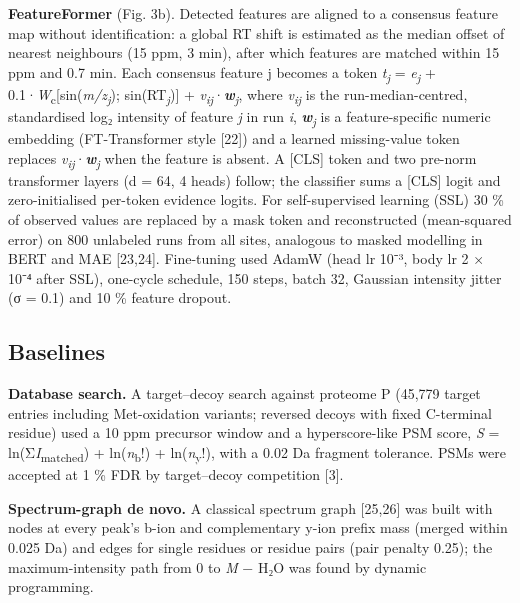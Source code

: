 \documentclass[
]{article}
\begin{document}
\textbf{FeatureFormer} (Fig. 3b). Detected features are aligned to a
consensus feature map without identification: a global RT shift is
estimated as the median offset of nearest neighbours (15 ppm, 3 min),
after which features are matched within 15 ppm and 0.7 min. Each
consensus feature j becomes a token \emph{t}\textsubscript{\emph{j}} =
\emph{e}\textsubscript{\emph{j}} +
0.1·\emph{W}\textsubscript{c}{[}sin(\emph{m/z}\textsubscript{\emph{j}});
sin(RT\textsubscript{\emph{j}}){]} +
\emph{v}\textsubscript{\emph{ij}}·\textbf{\emph{w}}\textsubscript{\emph{j}},
where \emph{v}\textsubscript{\emph{ij}} is the run-median-centred,
standardised log₂ intensity of feature \emph{j} in run \emph{i},
\textbf{\emph{w}}\textsubscript{\emph{j}} is a feature-specific numeric
embedding (FT-Transformer style {[}22{]}) and a learned missing-value
token replaces
\emph{v}\textsubscript{\emph{ij}}·\textbf{\emph{w}}\textsubscript{\emph{j}}
when the feature is absent. A {[}CLS{]} token and two pre-norm
transformer layers (d = 64, 4 heads) follow; the classifier sums a
{[}CLS{]} logit and zero-initialised per-token evidence logits. For
self-supervised learning (SSL) 30 \% of observed values are replaced by
a mask token and reconstructed (mean-squared error) on 800 unlabeled
runs from all sites, analogous to masked modelling in BERT and MAE
{[}23,24{]}. Fine-tuning used AdamW (head lr 10⁻³, body lr 2 × 10⁻⁴
after SSL), one-cycle schedule, 150 steps, batch 32, Gaussian intensity
jitter (σ = 0.1) and 10 \% feature dropout.

\hypertarget{baselines}{%
\subsection{Baselines}\label{baselines}}

\textbf{Database search.} A target--decoy search against proteome P
(45,779 target entries including Met-oxidation variants; reversed decoys
with fixed C-terminal residue) used a 10 ppm precursor window and a
hyperscore-like PSM score, \emph{S} =
ln(Σ\emph{I}\textsubscript{matched}) + ln(\emph{n}\textsubscript{b}!) +
ln(\emph{n}\textsubscript{y}!), with a 0.02 Da fragment tolerance. PSMs
were accepted at 1 \% FDR by target--decoy competition {[}3{]}.

\textbf{Spectrum-graph de novo.} A classical spectrum graph {[}25,26{]}
was built with nodes at every peak's b-ion and complementary y-ion
prefix mass (merged within 0.025 Da) and edges for single residues or
residue pairs (pair penalty 0.25); the maximum-intensity path from 0 to
\emph{M} − H₂O was found by dynamic programming.
\end{document}
